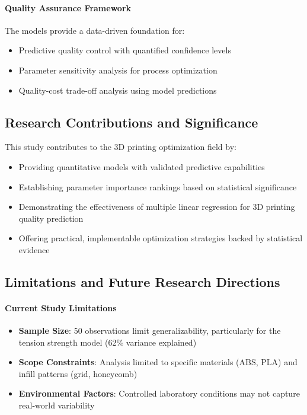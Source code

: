 \paragraph{Quality Assurance Framework}
The models provide a data-driven foundation for:
\begin{itemize}
    \item Predictive quality control with quantified confidence levels
    \item Parameter sensitivity analysis for process optimization
    \item Quality-cost trade-off analysis using model predictions
\end{itemize}

\subsection{Research Contributions and Significance}

This study contributes to the 3D printing optimization field by:

\begin{itemize}
    \item Providing quantitative models with validated predictive capabilities
    \item Establishing parameter importance rankings based on statistical significance
    \item Demonstrating the effectiveness of multiple linear regression for 3D printing quality prediction
    \item Offering practical, implementable optimization strategies backed by statistical evidence
\end{itemize}

\subsection{Limitations and Future Research Directions}

\paragraph{Current Study Limitations}
\begin{itemize}
    \item \textbf{Sample Size}: 50 observations limit generalizability, particularly for the tension strength model (62\% variance explained)
    \item \textbf{Scope Constraints}: Analysis limited to specific materials (ABS, PLA) and infill patterns (grid, honeycomb)
    \item \textbf{Environmental Factors}: Controlled laboratory conditions may not capture real-world variability
\end{itemize}

